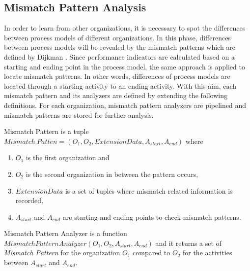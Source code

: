 \subsection{Mismatch Pattern Analysis}
\label{subsec:mismatch-pattern-analysis}
In order to learn from other organizations, it is necessary to spot the differences between process models of different organizations. In this phase, differences between process models will be revealed by the mismatch patterns which are defined by Dijkman \cite{dijkman2007mismatch}. Since performance indicators are calculated based on a starting and ending point in the process model, the same approach is applied to locate mismatch patterns. In other words, differences of process models are located through a starting activity to an ending activity. With this aim, each mismatch pattern and its analyzers are defined by extending the following definitions. For each organization, mismatch pattern analyzers are pipelined and mismatch patterns are stored for further analysis.
\theoremstyle{definition}
    \begin{definition}
    Mismatch Pattern is a tuple ${Mismatch\ Patten} = (O_{1}, O_{2}, ExtensionData, A_{start}, A_{end}) $ where 
    \begin{enumerate}
      \item $O_{1}$ is the first organization and \item $O_{2}$ is the second organization in between the pattern occurs,
      \item $ExtensionData$ is a set of tuples where mismatch related information is recorded, 
      \item $A_{start}$ and $A_{end}$ are starting and ending points to check mismatch patterns.
    \end{enumerate}
    \end{definition}
\theoremstyle{definition}

\begin{definition}
    Mismatch Pattern Analyzer is a function $MismatchPatternAnalyzer(O_{1}, O_{2}, A_{start}, A_{end})$ and it returns a set of \textit{Mismatch Pattern} for the organization $O_{1}$ compared to $O_{2}$ for the activities between $A_{start}$ and $A_{end}$.
\end{definition}

